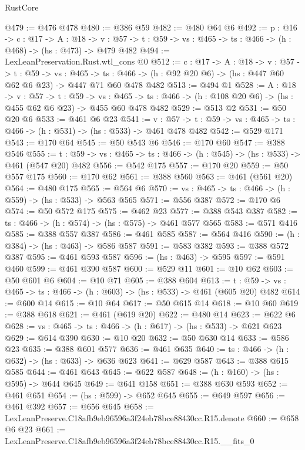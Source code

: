 \begin{lexlean}{RustCore}
\begin{coremodule}
@479 := @476 @478
@480 := @386 @59
@482 := @480 @64 @6
@492 := {p : @16} ->
  {c : @17} ->
  {A : @18} ->
  {v : @57} -> {t : @59} -> {vs : @465} -> {ts : @466} -> (h : @468) -> (hs : @473) -> @479 @482
@494 := LexLeanPreservation.Rust.wtl_cons @0
@512 := {c : @17} ->
  {A : @18} ->
  {v : @57} ->
  {t : @59} ->
  {vs : @465} ->
  {ts : @466} -> (h : @92 @20 @6) -> (hs : @447 @60 @62 @6 @23) -> @447 @71 @60 @478 @482
@513 := @494 @1
@528 := {A : @18} ->
  {v : @57} ->
  {t : @59} ->
  {vs : @465} -> {ts : @466} -> (h : @108 @20 @6) -> (hs : @455 @62 @6 @23) -> @455 @60 @478 @482
@529 := @513 @2
@531 := @50 @20 @6
@533 := @461 @6 @23
@541 := {v : @57} ->
  {t : @59} -> {vs : @465} -> {ts : @466} -> (h : @531) -> (hs : @533) -> @461 @478 @482
@542 := @529 @171
@543 := @170 @64
@545 := @50 @543 @6
@546 := @170 @60
@547 := @388 @546
@555 := {t : @59} -> {vs : @465} -> {ts : @466} -> (h : @545) -> (hs : @533) -> @461 (@547 @20) @482
@556 := @542 @175
@557 := @170 @20
@559 := @50 @557 @175
@560 := @170 @62
@561 := @388 @560
@563 := @461 (@561 @20)
@564 := @480 @175
@565 := @564 @6
@570 := {vs : @465} -> {ts : @466} -> (h : @559) -> (hs : @533) -> @563 @565
@571 := @556 @387
@572 := @170 @6
@574 := @50 @572 @175
@575 := @462 @23
@577 := @388 @543 @387
@582 := {ts : @466} -> (h : @574) -> (hs : @575) -> @461 @577 @565
@583 := @571 @416
@585 := @388 @557 @387
@586 := @461 @585
@587 := @564 @416
@590 := (h : @384) -> (hs : @463) -> @586 @587
@591 := @583 @382
@593 := @388 @572 @387
@595 := @461 @593 @587
@596 := (hs : @463) -> @595
@597 := @591 @460
@599 := @461 @390 @587
@600 := @529 @11
@601 := @10 @62
@603 := @50 @601 @6
@604 := @10 @71
@605 := @388 @604
@613 := {t : @59} -> {vs : @465} -> {ts : @466} -> (h : @603) -> (hs : @533) -> @461 (@605 @20) @482
@614 := @600 @14
@615 := @10 @64
@617 := @50 @615 @14
@618 := @10 @60
@619 := @388 @618
@621 := @461 (@619 @20)
@622 := @480 @14
@623 := @622 @6
@628 := {vs : @465} -> {ts : @466} -> (h : @617) -> (hs : @533) -> @621 @623
@629 := @614 @390
@630 := @10 @20
@632 := @50 @630 @14
@633 := @586 @23
@635 := @388 @601 @577
@636 := @461 @635
@640 := {ts : @466} -> (h : @632) -> (hs : @633) -> @636 @623
@641 := @629 @587
@643 := @388 @615 @585
@644 := @461 @643
@645 := @622 @587
@648 := (h : @160) -> (hs : @595) -> @644 @645
@649 := @641 @158
@651 := @388 @630 @593
@652 := @461 @651
@654 := (hs : @599) -> @652 @645
@655 := @649 @597
@656 := @461 @392
@657 := @656 @645
@658 := LexLeanPreserve.C18afb9eb96596a3f24eb78bce88430cc.R15.denote
@660 := @658 @6 @23
@661 := LexLeanPreserve.C18afb9eb96596a3f24eb78bce88430cc.R15.__fits_0

\end{coremodule}
\end{lexlean}
